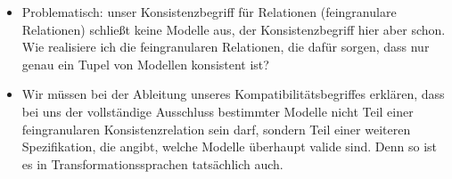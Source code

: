 \begin{itemize}
    \item Problematisch: unser Konsistenzbegriff für Relationen (feingranulare Relationen) schließt keine Modelle aus, der Konsistenzbegriff hier aber schon. Wie realisiere ich die feingranularen Relationen, die dafür sorgen, dass nur genau ein Tupel von Modellen konsistent ist?
    \item Wir müssen bei der Ableitung unseres Kompatibilitätsbegriffes erklären, dass bei uns der vollständige Ausschluss bestimmter Modelle nicht Teil einer feingranularen Konsistenzrelation sein darf, sondern Teil einer weiteren Spezifikation, die angibt, welche Modelle überhaupt valide sind. Denn so ist es in Transformationssprachen tatsächlich auch.
\end{itemize}


